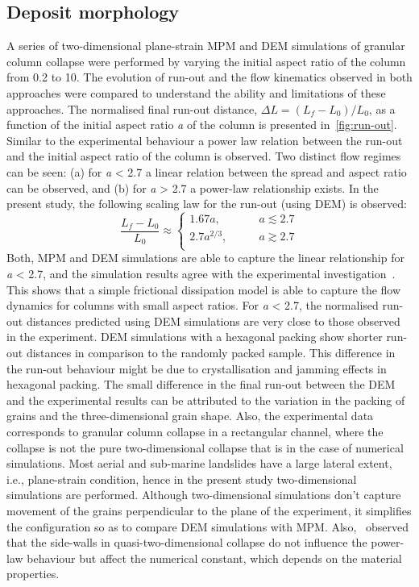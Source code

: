 \subsection{Deposit morphology}
A series of two-dimensional plane-strain MPM and DEM simulations of granular 
column collapse were performed by varying the initial aspect ratio of the 
column from 0.2 to 10. The evolution of run-out and the flow kinematics 
observed in both approaches were compared to understand the ability and 
limitations of these approaches. The normalised final run-out distance, $\Delta 
L = (L_{{f}}-L_{0})/L_{0}$, as a function of the initial aspect ratio 
\textit{a} of the column is presented in~\cref{fig:run-out}. Similar to the 
experimental behaviour a power law relation between the run-out 
and the initial aspect ratio of the column is observed. Two distinct flow 
regimes can be seen: (a) for \textit{a} < 2.7 a linear relation between the 
spread and aspect ratio can be observed, and (b) for \textit{a} > 2.7 a 
power-law relationship exists. In the present study, the following scaling law 
for the run-out (using DEM) is observed:
%
\begin{equation}
\frac{L_{{f}}-L_{0}}{L_{0}} \approx  
\begin{cases}
1.67 a, &\qquad \textit{a}\lesssim 2.7 \\
2.7 a^{2/3}, &\qquad \textit{a} \gtrsim 2.7 \\
\end{cases}
\end{equation}
Both, MPM and DEM simulations are able to capture the linear relationship for 
\textit{a} < 2.7, and the simulation results agree with the experimental 
investigation~\citep{Lajeunesse2005}. This shows that a simple frictional 
dissipation model is able to capture the flow dynamics for columns with small 
aspect ratios. For \textit{a} < 2.7, the normalised run-out distances predicted 
using DEM simulations are very close to those observed in the experiment. DEM 
simulations with a hexagonal packing show shorter run-out distances in 
comparison to the randomly packed sample. This difference in the run-out 
behaviour might be due to crystallisation and jamming effects in hexagonal 
packing. The small difference in the final run-out between the DEM and the 
experimental results can be attributed to the variation in the packing of 
grains and the three-dimensional grain shape. Also, the experimental data 
corresponds to granular column collapse in a rectangular channel, where the 
collapse is not the pure two-dimensional collapse that is in the case of 
numerical simulations. Most aerial and sub-marine landslides have a large 
lateral extent, i.e., plane-strain condition, hence in the present study 
two-dimensional simulations are performed. Although two-dimensional simulations 
don't capture movement of the grains perpendicular to the plane of the 
experiment, it simplifies the configuration so as to compare DEM simulations 
with MPM. Also,~\citet{Balmforth2005} observed that the side-walls 
in quasi-two-dimensional collapse do not influence the power-law behaviour 
but affect the numerical constant, which depends on the material properties. 

